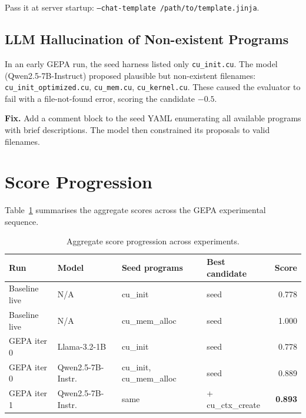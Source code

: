 \documentclass[11pt,a4paper]{article}
\begin{document}
Pass it at server startup: \texttt{--chat-template /path/to/template.jinja}.

\subsection{LLM Hallucination of Non-existent Programs}
\label{sec:hallucination}

In an early GEPA run, the seed harness listed only \texttt{cu\_init.cu}.
The model (Qwen2.5-7B-Instruct) proposed plausible but non-existent
filenames:
\texttt{cu\_init\_optimized.cu}, \texttt{cu\_mem.cu}, \texttt{cu\_kernel.cu}.
These caused the evaluator to fail with a file-not-found error, scoring
the candidate $-0.5$.

\textbf{Fix.}
Add a comment block to the seed YAML enumerating all available programs
with brief descriptions.
The model then constrained its proposals to valid filenames.

\section{Score Progression}
\label{sec:scores}

Table~\ref{tab:scores} summarises the aggregate scores across the GEPA
experimental sequence.

\begin{table}[H]
\centering
\caption{Aggregate score progression across experiments.}
\label{tab:scores}
\begin{tabular}{llllr}
\toprule
\textbf{Run} & \textbf{Model} & \textbf{Seed programs} & \textbf{Best candidate} & \textbf{Score} \\
\midrule
Baseline live   & N/A               & cu\_init          & seed         & 0.778 \\
Baseline live   & N/A               & cu\_mem\_alloc    & seed         & 1.000 \\
GEPA iter 0     & Llama-3.2-1B      & cu\_init          & seed         & 0.778 \\
GEPA iter 0     & Qwen2.5-7B-Instr. & cu\_init, cu\_mem\_alloc & seed & 0.889 \\
GEPA iter 1     & Qwen2.5-7B-Instr. & same              & + cu\_ctx\_create & \textbf{0.893} \\
\bottomrule
\end{tabular}
\end{table}
\end{document}
